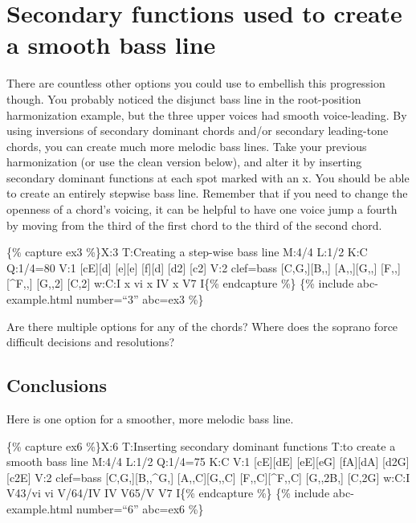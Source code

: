 \documentclass{book}
\begin{document}
\hypertarget{secondary-functions-used-to-create-a-smooth-bass-line}{%
\section{Secondary functions used to create a smooth bass
line}\label{secondary-functions-used-to-create-a-smooth-bass-line}}

There are countless other options you could use to embellish this progression
though. You probably noticed the disjunct bass line in the root-position
harmonization example, but the three upper voices had smooth voice-leading. By
using inversions of secondary dominant chords and/or secondary leading-tone
chords, you can create much more melodic bass lines. Take your previous
harmonization (or use the clean version below), and alter it by inserting
secondary dominant functions at each spot marked with an x. You should be able
to create an entirely stepwise bass line. Remember that if you need to change
the openness of a chord's voicing, it can be helpful to have one voice jump a
fourth by moving from the third of the first chord to the third of the second
chord.

\{\% capture ex3 \%\}X:3 T:Creating a step-wise bass line M:4/4 L:1/2 K:C
Q:1/4=80 V:1 {[}cE{]}{[}d{]}\textbar{} {[}e{]}{[}e{]}\textbar{}
{[}f{]}{[}d{]}\textbar{} {[}d2{]}\textbar{} {[}c2{]}\textbar{]} V:2 clef=bass
{[}C,G,{]}{[}B,,{]}\textbar{} {[}A,,{]}{[}G,,{]}\textbar{}
{[}F,,{]}{[}\^{}F,,{]}\textbar{} {[}G,,2{]}\textbar{} {[}C,2{]}\textbar{]}
w:C:I x vi x IV x V7 I\{\% endcapture \%\} \{\% include abc-example.html
number=``3'' abc=ex3 \%\}

Are there multiple options for any of the chords? Where does the soprano force
difficult decisions and resolutions?

\hypertarget{conclusions-13}{%
\subsection{Conclusions}\label{conclusions-13}}

Here is one option for a smoother, more melodic bass line.

\{\% capture ex6 \%\}X:6 T:Inserting secondary dominant functions T:to create
a smooth bass line M:4/4 L:1/2 Q:1/4=75 K:C V:1 {[}cE{]}{[}dE{]}\textbar{}
{[}eE{]}{[}eG{]}\textbar{} {[}fA{]}{[}dA{]}\textbar{} {[}d2G{]}\textbar{}
{[}c2E{]}\textbar{]} V:2 clef=bass {[}C,G,{]}{[}B,,\^{}G,{]}\textbar{}
{[}A,,C{]}{[}G,,C{]}\textbar{} {[}F,,C{]}{[}\^{}F,,C{]}\textbar{}
{[}G,,2B,{]}\textbar{} {[}C,2G{]}\textbar{]} w:C:I V43/vi vi V/64/IV IV V65/V
V7 I\{\% endcapture \%\} \{\% include abc-example.html number=``6'' abc=ex6
\%\}
\end{document}
